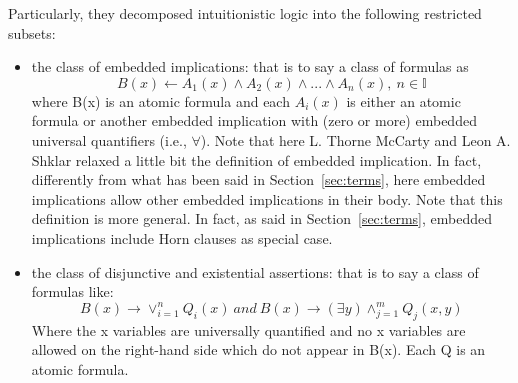 Particularly, they decomposed intuitionistic logic into the following restricted subsets:
\begin{itemize}
  \item the class of embedded implications: that is to say a class of formulas as
    \begin{equation}
      B(x) \leftarrow A_1(x) \wedge A_2(x) \wedge ... \wedge A_n(x),\ n \in \mathbb{I}
    \end{equation}
    where B(x) is an atomic formula and each $A_i(x)$ is either an atomic formula
    or another embedded implication with (zero or more) embedded universal quantifiers
    (i.e., $\forall$). Note that here L. Thorne McCarty and Leon A. Shklar relaxed
    a little bit the definition of embedded implication. In fact, differently from
    what has been said in Section~\ref{sec:terms}, here embedded implications allow
    other embedded implications in their body. Note that this definition is more
    general. In fact, as said in Section~\ref{sec:terms}, embedded implications
    include Horn clauses as special case.

  \item the class of disjunctive and existential assertions: that is to say a class
    of formulas like:
    \begin{equation}
      B(x) \rightarrow \lor^{n}_{i=1} Q_i(x)\ and\ B(x) \rightarrow (\exists y) \wedge^m_{j=1}Q_j(x,y)
    \end{equation}
    Where the x variables are universally quantified and no x variables are allowed
    on the right-hand side which do not appear in B(x). Each Q is an atomic formula.
\end{itemize}

